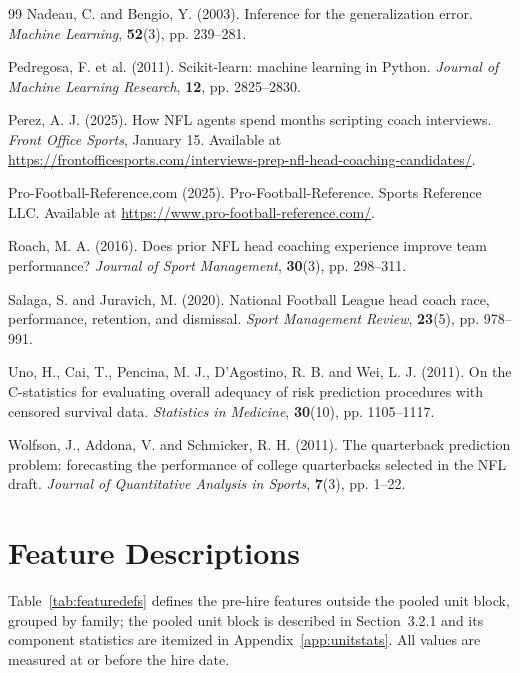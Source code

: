 \documentclass[USenglish]{article}
\theoremstyle{dgthm}
\theoremstyle{dgdef}
\begin{document}
\begin{thebibliography}{99}
Nadeau, C. and Bengio, Y. (2003). Inference for the generalization error. \emph{Machine Learning}, \textbf{52}(3), pp. 239--281.

Pedregosa, F. et al. (2011). Scikit-learn: machine learning in Python. \emph{Journal of Machine Learning Research}, \textbf{12}, pp. 2825--2830.

Perez, A. J. (2025). How NFL agents spend months scripting coach interviews. \emph{Front Office Sports}, January 15. Available at \url{https://frontofficesports.com/interviews-prep-nfl-head-coaching-candidates/}.

Pro-Football-Reference.com (2025). Pro-Football-Reference. Sports Reference LLC. Available at \url{https://www.pro-football-reference.com/}.

Roach, M. A. (2016). Does prior NFL head coaching experience improve team performance? \emph{Journal of Sport Management}, \textbf{30}(3), pp. 298--311.

Salaga, S. and Juravich, M. (2020). National Football League head coach race, performance, retention, and dismissal. \emph{Sport Management Review}, \textbf{23}(5), pp. 978--991.

Uno, H., Cai, T., Pencina, M. J., D'Agostino, R. B. and Wei, L. J. (2011). On the C-statistics for evaluating overall adequacy of risk prediction procedures with censored survival data. \emph{Statistics in Medicine}, \textbf{30}(10), pp. 1105--1117.

Wolfson, J., Addona, V. and Schmicker, R. H. (2011). The quarterback prediction problem: forecasting the performance of college quarterbacks selected in the NFL draft. \emph{Journal of Quantitative Analysis in Sports}, \textbf{7}(3), pp. 1--22.

\end{thebibliography}

\clearpage

\appendix

\section{Feature Descriptions}
\label{app:features}

Table~\ref{tab:featuredefs} defines the pre-hire features outside the pooled unit block, grouped by family; the pooled unit block is described in Section~3.2.1 and its component statistics are itemized in Appendix~\ref{app:unitstats}. All values are measured at or before the hire date.
\end{document}
